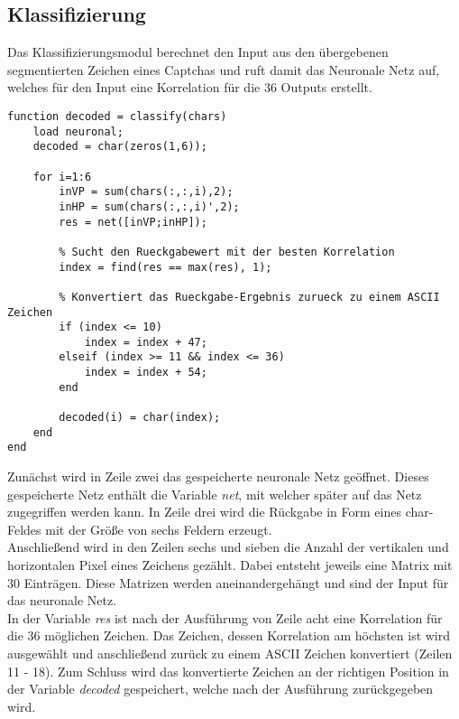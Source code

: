 \subsection{Klassifizierung}
Das Klassifizierungsmodul berechnet den Input aus den übergebenen segmentierten Zeichen eines Captchas und ruft damit das Neuronale Netz auf, welches für den Input eine Korrelation für die 36 Outputs erstellt.
\begin{lstlisting}
function decoded = classify(chars)
    load neuronal;
    decoded = char(zeros(1,6));
    
    for i=1:6
        inVP = sum(chars(:,:,i),2);
        inHP = sum(chars(:,:,i)',2);
        res = net([inVP;inHP]);
   
        % Sucht den Rueckgabewert mit der besten Korrelation
        index = find(res == max(res), 1);
        
        % Konvertiert das Rueckgabe-Ergebnis zurueck zu einem ASCII Zeichen
        if (index <= 10)
            index = index + 47;
        elseif (index >= 11 && index <= 36)
            index = index + 54;
        end

        decoded(i) = char(index);
    end
end
\end{lstlisting}
Zunächst wird in Zeile zwei das gespeicherte neuronale Netz geöffnet. Dieses gespeicherte Netz enthält die Variable \textit{net}, mit welcher später auf das Netz zugegriffen werden kann. In Zeile drei wird die Rückgabe in Form eines char-Feldes mit der Größe von sechs Feldern erzeugt.\\
Anschließend wird in den Zeilen sechs und sieben die Anzahl der vertikalen und horizontalen Pixel eines Zeichens gezählt. Dabei entsteht jeweils eine Matrix mit 30 Einträgen. Diese Matrizen werden aneinandergehängt und sind der Input für das neuronale Netz.\\
In der Variable \textit{res} ist nach der Ausführung von Zeile acht eine Korrelation für die 36 möglichen Zeichen. Das Zeichen, dessen Korrelation am höchsten ist wird ausgewählt und anschließend zurück zu einem ASCII Zeichen konvertiert (Zeilen 11 - 18). Zum Schluss wird das konvertierte Zeichen an der richtigen Position in der Variable \textit{decoded} gespeichert, welche nach der Ausführung zurückgegeben wird. 

\newpage
